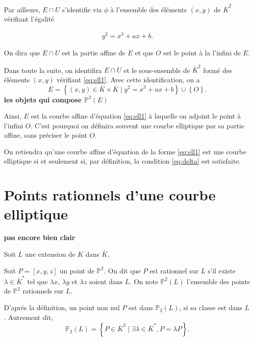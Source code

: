 Par ailleurs, $E \cap U$ s'identifie via $\phi$ à l'ensemble des éléments $(x,y)$ de $\overline{K}^2$ vérifiant l'égalité

\begin{align}
    \label{eq:ell1}
y^2 = x^3 + ax + b
.\end{align}

On dira que $E \cap U$ est la partie affine de $E$ et que $O$ est le point à la l'infini de $E$.

Dans toute la suite, on identifira $E \cap U$ et le sous-ensemble de $\overline{K}^2$ formé des éléments $(x,y)$ vérifiant \eqref{eq:ell1}. Avec cette identification, on a 
\[
E = \left\{ (x,y) \in \overline{K} \times \overline{K} \mid y^2=x^3+ax+b \right\} \cup \left\{ O \right\} 
.\] 
\textbf{les objets qui compose $\mathbb{P}^2(E)$}

Ainsi, $E$ est la courbe affine d'équation \eqref{eq:ell1} à laquelle on adjoint le point à l'infini $O$. C'est pourquoi on définira souvent une courbe elliptique par sa partie affine, sans préciser le point $O$.

\begin{remarque}
    On retiendra qu'une courbe affine d'équation de la forme \eqref{eq:ell1} est une courbe
    elliptique si et seulement si, par définition, la condition \eqref{eq:delta} est satisfaite.
\end{remarque}

\section{Points rationnels d'une courbe elliptique}
\textbf{pas encore bien clair}

Soit $L$ une extension de $K$ dans $\overline{K}$.

\begin{definition}
    Soit $P=\left[ x,y,z \right] $ un point de $\mathbb{P}^2$. On dit que $P$ est rationnel sur $L$ s'il existe $\lambda \in \overline{K}^{*}$ tel que $\lambda x$, $\lambda y$ et $\lambda z$ soient dans $L$. On note $\mathbb{P}^2(L)$ l'ensemble des points de $\mathbb{P}^2$ rationnels sur $L$.

\end{definition}

D'aprés la définition, un point non nul $P$ est dans $\mathbb{P}_{2}(L)$, si sa classe est dans $L$. Autrement
dit, 
\[
\mathbb{P}_{2}(L)=\left\{ P \in \overline{K}^{3} \mid \exists \lambda \in \overline{K}^{*}, P =
\lambda P\right\} 
.\] 

